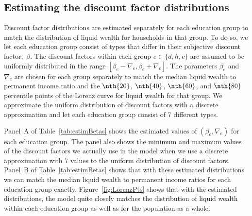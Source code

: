 \documentclass[../HAFiscal]{subfiles}
\begin{document}
\subsection{Estimating the discount factor distributions} 
\label{sec:estimBetas}

Discount factor distributions are estimated separately for each education group to match the distribution of liquid wealth for households in that group. To do so, we let each education group consist of types that differ in their subjective discount factor,~$\beta$. The discount factors within each group $e\in \{d, h, c\}$ are assumed to be uniformly distributed in the range $[\beta_e-\nabla_e, \beta_e+\nabla_e]$. The parameters $\beta_e$ and $\nabla_e$ are chosen for each group separately to match the median liquid wealth to permanent income ratio and the $\nth{20}$, $\nth{40}$, $\nth{60}$, and $\nth{80}$ percentile points of the Lorenz curve for liquid wealth for that group. We approximate the uniform distribution of discount factors with a discrete approximation and let each education group consist of $7$ different types.

Panel~A of Table~\ref{tab:estimBetas} shows the estimated values of $(\beta_e, \nabla_e)$ for each education group. The panel also shows the minimum and maximum values of the discount factors we actually use in the model when we use a discrete approximation with $7$ values to the uniform distribution of discount factors. Panel~B of Table~\ref{tab:estimBetas} shows that with these estimated distributions we can match the median liquid wealth to permanent income ratios for each education group exactly. Figure~\ref{fig:LorenzPts} shows that with the estimated distributions, the model quite closely matches the distribution of liquid wealth within each education group as well as for the population as a whole. 
\end{document}
